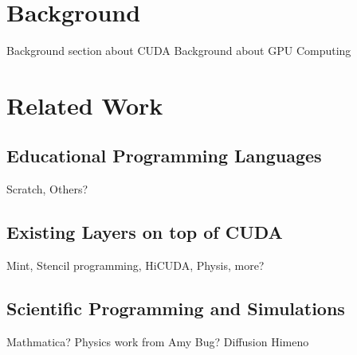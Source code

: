 \section{Background}

Background section about CUDA
Background about GPU Computing

\section{Related Work}


\subsection{Educational Programming Languages}
Scratch, Others?

\subsection{Existing Layers on top of CUDA}
Mint, Stencil programming, HiCUDA, Physis, more?

\subsection{Scientific Programming and Simulations}
Mathmatica? Physics work from Amy Bug?
Diffusion
Himeno
